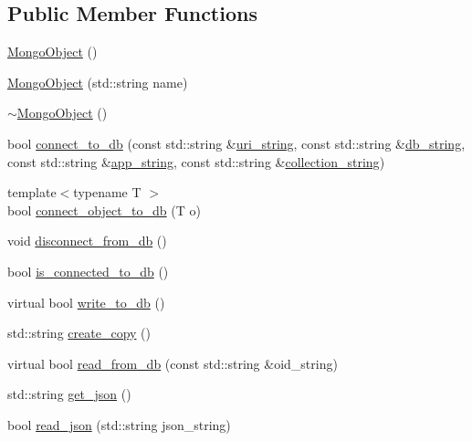 \subsection*{Public Member Functions}
\begin{DoxyCompactItemize}
\item 
\hyperlink{class_mongo_object_ae0438efeae33db2bfeb3972e1196a8a9}{Mongo\+Object} ()
\item 
\hyperlink{class_mongo_object_a9e876f9d6e7cfcb7d4ce9046014e2b5f}{Mongo\+Object} (std\+::string name)
\item 
\hyperlink{class_mongo_object_ac1aba6b5189bca3feb08a698a01c1c30}{$\sim$\+Mongo\+Object} ()
\item 
bool \hyperlink{class_mongo_object_a7ef98cecb5c625a9c3e9a57373be41b8}{connect\+\_\+to\+\_\+db} (const std\+::string \&\hyperlink{class_mongo_object_a71e3fa5196ad3b496d0aa326d61e84e8}{uri\+\_\+string}, const std\+::string \&\hyperlink{class_mongo_object_a215dc4379af5ac81e19d245f5d5d37e0}{db\+\_\+string}, const std\+::string \&\hyperlink{class_mongo_object_ace5148b45dd674c73077a044d0233ed8}{app\+\_\+string}, const std\+::string \&\hyperlink{class_mongo_object_a59d2d926fd2f8048b1dab88b3e1fea5b}{collection\+\_\+string})
\item 
{\footnotesize template$<$typename T $>$ }\\bool \hyperlink{class_mongo_object_adbb80b6af3e780c81cc455f480507749}{connect\+\_\+object\+\_\+to\+\_\+db} (T o)
\item 
void \hyperlink{class_mongo_object_ae541414f753a8fd792cf0be163117b99}{disconnect\+\_\+from\+\_\+db} ()
\item 
bool \hyperlink{class_mongo_object_ae67113e87e4dadcd51c23aa373eba61d}{is\+\_\+connected\+\_\+to\+\_\+db} ()
\item 
virtual bool \hyperlink{class_mongo_object_a65971bad07dce8b649820f9dee5d0ae8}{write\+\_\+to\+\_\+db} ()
\item 
std\+::string \hyperlink{class_mongo_object_ad5165ed92020fba7d502a3556794ab4f}{create\+\_\+copy} ()
\item 
virtual bool \hyperlink{class_mongo_object_a729412e226c9964e13ba80688c3f5e00}{read\+\_\+from\+\_\+db} (const std\+::string \&oid\+\_\+string)
\item 
std\+::string \hyperlink{class_mongo_object_acde33629416d7f926737237264ac6ca1}{get\+\_\+json} ()
\item 
bool \hyperlink{class_mongo_object_adce8ffc4811a9d1c94701711f574bc34}{read\+\_\+json} (std\+::string json\+\_\+string)
\item 

\end{DoxyCompactItemize}
